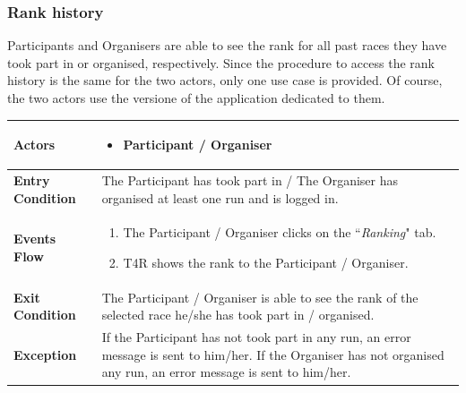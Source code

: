         \subsubsection{Rank history}
            Participants and Organisers are able to see the rank for all past races they have took part in or organised, respectively. Since the procedure to access the rank history is the same for the two actors, only one use case is provided. Of course, the two actors use the versione of the application dedicated to them.

            \begin{table}[H]
            	\centering
                
                \begin{tabular}{|p{3cm}|p{8.2cm}|}
                    \hline
                    \textbf{Actors} & \begin{itemize}
                                            \item Participant / Organiser
                                        \end{itemize} \\
                     \hline
                    \textbf{Entry Condition} & The Participant has took part in / The Organiser has organised at least                              one run and is logged in. \\
                     \hline
                    \textbf{Events Flow} & \begin{enumerate}
                                                \item The Participant / Organiser clicks on the ``\emph{Ranking}" tab.
                                                \item T4R shows the rank to the Participant / Organiser.
                                            \end{enumerate} \\
                     \hline
                    \textbf{Exit Condition} & The Participant / Organiser is able to see the rank of the selected race                             he/she has took part in / organised. \\
                     \hline
                    \textbf{Exception} & If the Participant has not took part in any run, an error                       message is sent to him/her. \newline
                                         If the Organiser has not organised any run, an error message is sent to him/her. \\
                     \hline
                \end{tabular}  
            \end{table}
            
